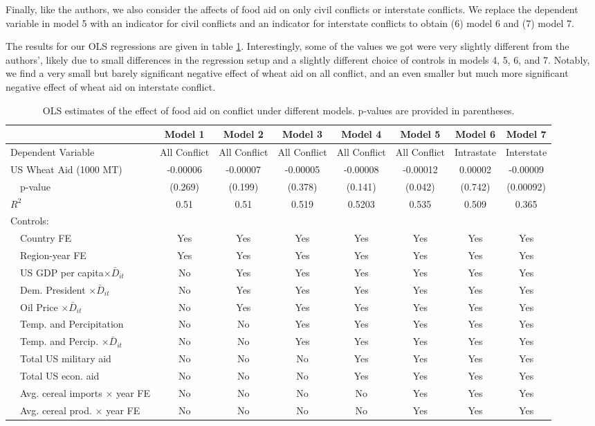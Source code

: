 \documentclass{article}
\begin{document}
Finally, like the authors, we also consider the affects of food aid on only civil conflicts or interstate conflicts. We replace the dependent variable in model 5 with an indicator for civil conflicts and an indicator for interstate conflicts to obtain (6) model 6 and (7) model 7. 

The results for our OLS regressions are given in table \ref{ols}. Interestingly, some of the values we got were very slightly different from the authors', likely due to small differences in the regression setup and a slightly different choice of controls in models 4, 5, 6, and 7.  Notably, we find a very small but barely significant negative effect of wheat aid on all conflict, and an even smaller but much more significant negative effect of wheat aid on interstate conflict. 
\begin{table}
\centering
\scriptsize
\begin{tabular}{| l | c | c | c | c | c | c | c |}
\hline
& Model 1 & Model 2 & Model 3 & Model 4 & Model 5 & Model 6 & Model 7\\
\hline
Dependent Variable & All Conflict &  All Conflict &  All Conflict &  All Conflict & All Conflict & Intrastate & Interstate \\
\hline 
US Wheat Aid (1000 MT) & -0.00006 & -0.00007  & -0.00005  & -0.00008  & -0.00012  & 0.00002  & -0.00009 \\
~~p-value & (0.269) & (0.199) & (0.378) & (0.141) & (0.042) & (0.742) & (0.00092)\\
$R^2$ & 0.51 & 0.51 & 0.519 & 0.5203 & 0.535 & 0.509 & 0.365  \\
\hline
Controls:\\
~~Country FE & Yes & Yes & Yes & Yes & Yes & Yes & Yes \\
~~Region-year FE & Yes & Yes & Yes & Yes & Yes & Yes & Yes \\
~~US GDP per capita$\times \bar D_{it}$  & No & Yes & Yes & Yes & Yes & Yes & Yes \\
~~Dem. President $\times \bar D_{it}$ & No & Yes & Yes & Yes & Yes & Yes & Yes \\
~~Oil Price $\times \bar D_{it}$ & No & Yes & Yes & Yes & Yes & Yes & Yes \\
~~Temp. and Percipitation & No & No & Yes & Yes & Yes & Yes & Yes \\
~~Temp. and Percip. $\times \bar D_{it}$& No & No & Yes & Yes & Yes & Yes & Yes \\
~~Total US military aid  & No & No & No & Yes & Yes & Yes & Yes \\
~~Total US econ. aid & No & No & No & Yes & Yes & Yes & Yes \\
~~Avg. cereal imports $\times$ year FE & No & No & No & No & Yes & Yes & Yes \\
~~Avg. cereal prod. $\times$ year FE & No & No & No & No & Yes & Yes & Yes \\
\hline
\end{tabular}
\label{ols}
\normalsize
\caption{OLS estimates of the 
effect of food aid on conflict under different models. p-values are provided in parentheses.}
\end{table}
\end{document}
